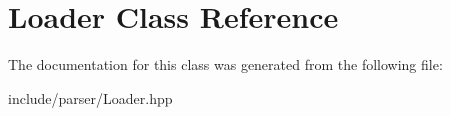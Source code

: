 \hypertarget{classLoader}{}\section{Loader Class Reference}
\label{classLoader}


The documentation for this class was generated from the following file\+:\begin{DoxyCompactItemize}
\item 
include/parser/Loader.\+hpp\end{DoxyCompactItemize}
